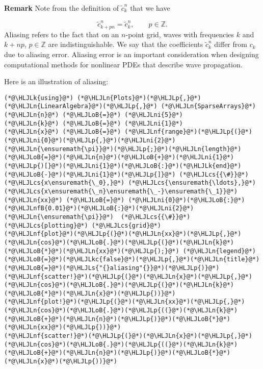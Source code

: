 \documentclass[12pt,landscape]{article}
\newcommand{\HLJLk}[1]{\textcolor[RGB]{148,91,176}{\textbf{#1}}}
\newcommand{\HLJLkc}[1]{\textcolor[RGB]{59,151,46}{\textit{#1}}}
\newcommand{\HLJLn}[1]{#1}
\newcommand{\HLJLnf}[1]{\textcolor[RGB]{66,102,213}{#1}}
\newcommand{\HLJLs}[1]{\textcolor[RGB]{201,61,57}{#1}}
\newcommand{\HLJLnfB}[1]{\textcolor[RGB]{59,151,46}{#1}}
\newcommand{\HLJLni}[1]{\textcolor[RGB]{59,151,46}{#1}}
\newcommand{\HLJLoB}[1]{\textcolor[RGB]{102,102,102}{\textbf{#1}}}
\newcommand{\HLJLp}[1]{#1}
\newcommand{\HLJLcs}[1]{\textcolor[RGB]{153,153,119}{\textit{#1}}}
\begin{document}
{\textbf{Remark} Note from the definition of $\tilde{c}^n_{k}$ that we have

\[
\tilde{c}^n_{k+pn} = \tilde{c}^n_{k}, \qquad p \in \mathbb{Z}.  
\]
Aliasing refers to the fact that on an $n$-point grid, waves with frequencies $k$ and $k + np$, $p \in \mathbb{Z}$ are indistinguishable.  We say that the coefficients $\tilde{c}^n_k$ differ from $c_k$ due to aliasing error.  Aliasing error is an important consideration when designing computational methods for nonlinear PDEs that describe wave propagation.

Here is an illustration of aliasing:


\begin{lstlisting}
(*@\HLJLk{using}@*) (*@\HLJLn{Plots}@*)(*@\HLJLp{,}@*) (*@\HLJLn{LinearAlgebra}@*)(*@\HLJLp{,}@*) (*@\HLJLn{SparseArrays}@*)
(*@\HLJLn{n}@*) (*@\HLJLoB{=}@*) (*@\HLJLni{5}@*)
(*@\HLJLn{k}@*) (*@\HLJLoB{=}@*) (*@\HLJLni{1}@*)
(*@\HLJLn{x}@*) (*@\HLJLoB{=}@*) (*@\HLJLnf{range}@*)(*@\HLJLp{(}@*)(*@\HLJLni{0}@*)(*@\HLJLp{,}@*)(*@\HLJLni{2}@*)(*@\HLJLn{\ensuremath{\pi}}@*)(*@\HLJLp{;}@*)(*@\HLJLn{length}@*)(*@\HLJLoB{=}@*)(*@\HLJLn{n}@*)(*@\HLJLoB{+}@*)(*@\HLJLni{1}@*)(*@\HLJLp{)[}@*)(*@\HLJLni{1}@*)(*@\HLJLoB{:}@*)(*@\HLJLk{end}@*)(*@\HLJLoB{-}@*)(*@\HLJLni{1}@*)(*@\HLJLp{]}@*) (*@\HLJLcs{{\#}}@*) (*@\HLJLcs{x\ensuremath{\_0},}@*) (*@\HLJLcs{\ensuremath{\ldots},}@*) (*@\HLJLcs{x\ensuremath{\_n}\ensuremath{\_-}\ensuremath{\_1}}@*) 
(*@\HLJLn{xx}@*) (*@\HLJLoB{=}@*) (*@\HLJLni{0}@*)(*@\HLJLoB{:}@*)(*@\HLJLnfB{0.01}@*)(*@\HLJLoB{:}@*)(*@\HLJLni{2}@*)(*@\HLJLn{\ensuremath{\pi}}@*)  (*@\HLJLcs{{\#}}@*) (*@\HLJLcs{plotting}@*) (*@\HLJLcs{grid}@*)
(*@\HLJLnf{plot}@*)(*@\HLJLp{(}@*)(*@\HLJLn{xx}@*)(*@\HLJLp{,}@*)(*@\HLJLn{cos}@*)(*@\HLJLoB{.}@*)(*@\HLJLp{(}@*)(*@\HLJLn{k}@*)(*@\HLJLoB{*}@*)(*@\HLJLn{xx}@*)(*@\HLJLp{);}@*) (*@\HLJLn{legend}@*)(*@\HLJLoB{=}@*)(*@\HLJLkc{false}@*)(*@\HLJLp{,}@*)(*@\HLJLn{title}@*)(*@\HLJLoB{=}@*)(*@\HLJLs{"{}aliasing"{}}@*)(*@\HLJLp{)}@*)
(*@\HLJLnf{scatter!}@*)(*@\HLJLp{(}@*)(*@\HLJLn{x}@*)(*@\HLJLp{,}@*)(*@\HLJLn{cos}@*)(*@\HLJLoB{.}@*)(*@\HLJLp{(}@*)(*@\HLJLn{k}@*)(*@\HLJLoB{*}@*)(*@\HLJLn{x}@*)(*@\HLJLp{))}@*)
(*@\HLJLnf{plot!}@*)(*@\HLJLp{(}@*)(*@\HLJLn{xx}@*)(*@\HLJLp{,}@*)(*@\HLJLn{cos}@*)(*@\HLJLoB{.}@*)(*@\HLJLp{((}@*)(*@\HLJLn{k}@*)(*@\HLJLoB{+}@*)(*@\HLJLn{n}@*)(*@\HLJLp{)}@*)(*@\HLJLoB{*}@*)(*@\HLJLn{xx}@*)(*@\HLJLp{))}@*)
(*@\HLJLnf{scatter!}@*)(*@\HLJLp{(}@*)(*@\HLJLn{x}@*)(*@\HLJLp{,}@*)(*@\HLJLn{cos}@*)(*@\HLJLoB{.}@*)(*@\HLJLp{((}@*)(*@\HLJLn{k}@*)(*@\HLJLoB{+}@*)(*@\HLJLn{n}@*)(*@\HLJLp{)}@*)(*@\HLJLoB{*}@*)(*@\HLJLn{x}@*)(*@\HLJLp{))}@*)
\end{lstlisting}

}
\end{document}
